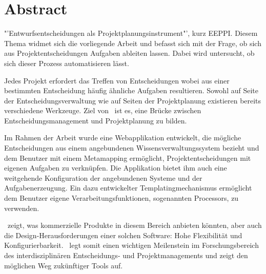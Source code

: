 \chapter{Abstract}
	

	"'Entwurfsentscheidungen als Projektplanungsinstrument"', kurz EEPPI. 
	Diesem Thema widmet sich die vorliegende Arbeit und befasst sich mit der Frage, 
	ob sich aus Projektentscheidungen Aufgaben ableiten lassen.
	Dabei wird untersucht, ob sich dieser Prozess automatisieren lässt.

	Jedes Projekt erfordert das Treffen von Entscheidungen wobei aus einer bestimmten Entscheidung häufig ähnliche Aufgaben resultieren.
	Sowohl auf Seite der Entscheidungsverwaltung wie auf Seiten der Projektplanung existieren bereits verschiedene Werkzeuge.
	Ziel von \eeppi\ ist es, eine Brücke zwischen Entscheidungsmanagement und Projektplanung zu bilden.

	Im Rahmen der Arbeit wurde eine Webapplikation entwickelt, 
	die mögliche Entscheidungen aus einem angebundenen Wissensverwaltungssystem bezieht
	und dem Benutzer mit einem Metamapping ermöglicht,
	Projektentscheidungen mit eigenen Aufgaben zu verknüpfen.
	Die Applikation bietet ihm auch eine weitgehende Konfiguration der angebundenen Systeme und der Aufgabenerzeugung. 
	Ein dazu entwickelter Templatingmechanismus ermöglicht dem Benutzer eigene Verarbeitungsfunktionen, sogenannten Processors, zu verwenden.

	\eeppi\ zeigt, was kommerzielle Produkte in diesem Bereich anbieten könnten,
	aber auch die Design-Herausforderungen einer solchen Software: 
	Hohe Flexibilität und Konfigurierbarkeit.
	\eeppi\ legt somit einen wichtigen Meilenstein im Forschungsbereich des interdisziplinären Entscheidungs- und Projektmanagements und
	zeigt den möglichen Weg zukünftiger Tools auf.
